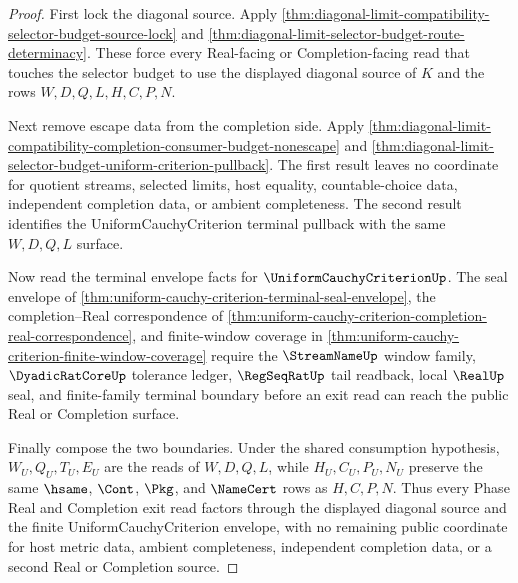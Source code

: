 \begin{proof}
First lock the diagonal source. Apply \autoref{thm:diagonal-limit-compatibility-selector-budget-source-lock} and \autoref{thm:diagonal-limit-selector-budget-route-determinacy}. These force every Real-facing or Completion-facing read that touches the selector budget to use the displayed diagonal source of $K$ and the rows $W,D,Q,L,H,C,P,N$.

Next remove escape data from the completion side. Apply \autoref{thm:diagonal-limit-compatibility-completion-consumer-budget-nonescape} and \autoref{thm:diagonal-limit-selector-budget-uniform-criterion-pullback}. The first result leaves no coordinate for quotient streams, selected limits, host equality, countable-choice data, independent completion data, or ambient completeness. The second result identifies the UniformCauchyCriterion terminal pullback with the same $W,D,Q,L$ surface.

Now read the terminal envelope facts for $\UniformCauchyCriterionUp$. The seal envelope of \autoref{thm:uniform-cauchy-criterion-terminal-seal-envelope}, the completion--Real correspondence of \autoref{thm:uniform-cauchy-criterion-completion-real-correspondence}, and finite-window coverage in \autoref{thm:uniform-cauchy-criterion-finite-window-coverage} require the $\StreamNameUp$ window family, $\DyadicRatCoreUp$ tolerance ledger, $\RegSeqRatUp$ tail readback, local $\RealUp$ seal, and finite-family terminal boundary before an exit read can reach the public Real or Completion surface.

Finally compose the two boundaries. Under the shared consumption hypothesis, $W_U,Q_U,T_U,E_U$ are the reads of $W,D,Q,L$, while $H_U,C_U,P_U,N_U$ preserve the same $\hsame$, $\Cont$, $\Pkg$, and $\NameCert$ rows as $H,C,P,N$. Thus every Phase Real and Completion exit read factors through the displayed diagonal source and the finite UniformCauchyCriterion envelope, with no remaining public coordinate for host metric data, ambient completeness, independent completion data, or a second Real or Completion source.
\end{proof}

